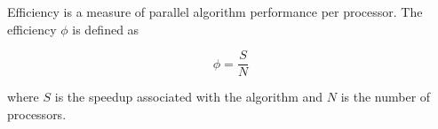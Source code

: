 \documentclass[12pt]{article}
\begin{document}

Efficiency is a measure of parallel algorithm performance per processor.  The efficiency $\phi$ is defined as

$$ \phi = \frac{S}{N} $$

where $S$ is the speedup associated with the algorithm and $N$ is the number of processors.
\end{document}

